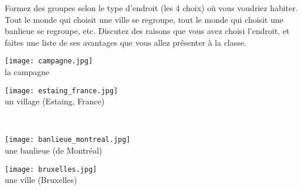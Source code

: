 \begin{frame}{}
  \scriptsize
  Formez des groupes selon le type d'endroit (les 4 choix) où vous voudriez habiter.
  Tout le monde qui choisit une ville se regroupe, tout le monde qui choisit une banlieue se regroupe, etc.
  Discutez des raisons que vous avez choisi l'endroit, et faites une liste de ses avantages que vous allez présenter à la classe.
  \begin{center}
  \parbox{0.49\linewidth}{
    \texttt{[image: campagne.jpg]} \\
    la campagne
  }
  \parbox{0.49\linewidth}{
    \texttt{[image: estaing\_france.jpg]} \\
    un village (Estaing, France)
  } \\
  \parbox{0.49\linewidth}{
    \texttt{[image: banlieue\_montreal.jpg]} \\
    une banlieue (de Montréal)
  }
  \parbox{0.49\linewidth}{
    \texttt{[image: bruxelles.jpg]} \\
    une ville (Bruxelles)
  }
  \end{center}
\end{frame}